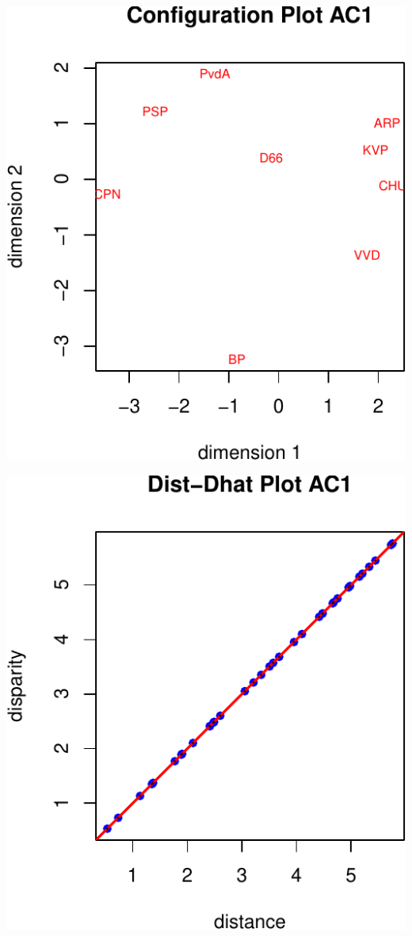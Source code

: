 \documentclass[
  12pt,
]{article}
\begin{document}
\begin{center}\includegraphics{smacofAC_files/figure-latex/gruijterh11-2} \end{center}

\begin{center}\includegraphics{smacofAC_files/figure-latex/gruijterh11-3} \end{center}
\end{document}
